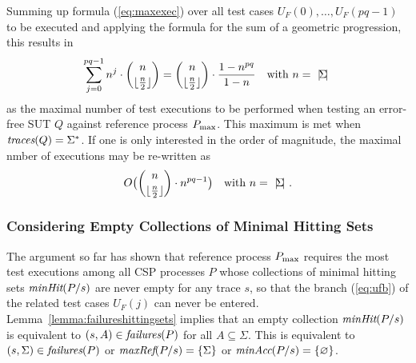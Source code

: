 Summing up  formula
(\ref{eq:maxexec}) over all test cases $U_F(0),\dots,U_F(pq-1)$ to be executed and applying the formula for the sum of a geometric progression,  this results in
%
\begin{equation}\label{eq:pmaxcomplexity}
\sum_{j=0}^{pq-1} n^{j}\cdot \binom{n}{\lfloor\frac{n}{2}\rfloor}  =
\binom{n}{\lfloor\frac{n}{2}\rfloor}\cdot\frac{1-n^{pq}}{1-n}\quad\text{with $n={~|\! \Sigma\!|~}$}
\end{equation}
%
as the maximal number of test executions to be performed when testing an error-free
SUT $Q$ against reference process $P_\text{max}$. This maximum is met when $\text{\it traces}(Q) = \Sigma^*$.
If one is only interested in the order of magnitude, the maximal nmber of executions
may be re-written as
%
\begin{equation}
\label{eq:maxO}
O\big(\binom{n}{\lfloor\frac{n}{2}\rfloor}\cdot n^{pq-1}\big)\quad\text{with $n={~|\! \Sigma\!|~}$}.
\end{equation}


\subsubsection*{Considering Empty Collections of Minimal Hitting Sets}

The argument so far has shown that reference process $P_\text{max}$ requires the most test
executions among all CSP processes $P$ whose collections of minimal hitting sets
$\text{\it minHit}(P/s)$ are never empty for any trace $s$, so that the branch
(\ref{eq:ufb}) of the related test cases $U_F(j)$ can never be entered.
Lemma~\ref{lemma:failureshittingsets} implies that an empty collection
$\text{\it minHit}(P/s)$
is equivalent to $(s,A)\in\text{\it failures}(P)$ for all $A\subseteq\Sigma$. This is equivalent to
$(s,\Sigma)\in\text{\it failures}(P)$ or
$\text{\it maxRef}(P/s) = \{ \Sigma \}$ or $\text{\it minAcc}(P/s) = \{ \varnothing\}$.

